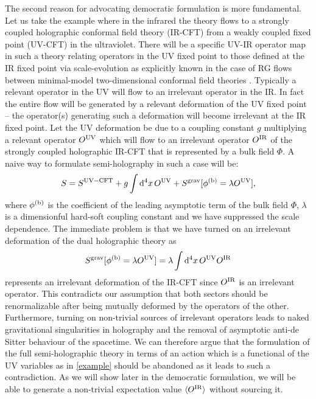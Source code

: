 \documentclass[prd,reprint,a4paper,showpacs,superscriptaddress,11pt,onecolumn,nofootinbib]{revtex4-1}
\renewcommand{\(}{\left(}
\renewcommand{\)}{\right)}
\newcommand{\6}{\partial}
\begin{document}
The second reason for advocating democratic formulation is more fundamental. Let us take the example where in the infrared the theory flows to a strongly coupled holographic conformal field theory (IR-CFT) from a weakly coupled fixed point (UV-CFT) in the ultraviolet. There will be a specific UV-IR operator map in such a theory relating operators in the UV fixed point to those defined at the IR fixed point via scale-evolution as explicitly known in the case of RG flows between minimal-model two-dimensional conformal field theories \cite{Zamolodchikov:1987ti,Zamolodchikov:1987jf,Ludwig:1987gs}. Typically a relevant operator in the UV will flow to an irrelevant operator in the IR. In fact the entire flow will be generated by a relevant deformation of the UV fixed point -- the operator(s) generating such a deformation will become irrelevant at the IR fixed point. Let the UV deformation be due to a coupling constant $g$ multiplying a relevant operator $O^{\rm UV}$ which will flow to an irrelevant operator $O^{\rm IR}$ of the strongly coupled holographic IR-CFT that is represented by a bulk field $\Phi$. A naive way to formulate semi-holography in such a case will be:
\begin{equation}\label{example}
S = S^{\rm UV-CFT} + g \int{\rm d}^4x \, O^{\rm UV} + S^{\rm grav}[\phi^{\rm (b)} = \lambda O^{\rm UV} ],
\end{equation} 
where $\phi^{\rm (b)}$ is the coefficient of the leading asymptotic term of the bulk field $\Phi$, $\lambda$ is a dimensionful hard-soft coupling constant and we have suppressed the scale dependence. The immediate problem is that we have turned on an irrelevant deformation of the dual holographic theory as
\begin{equation}
S^{\rm grav}[\phi^{\rm (b)} = \lambda O^{\rm UV} ] =\lambda \int {\rm d}^4 x\, O^{\rm UV}O^{\rm IR}
\end{equation}
represents an irrelevant deformation of the IR-CFT since $O^{\rm IR}$ is an irrelevant operator. This contradicts our assumption that both sectors should be renormalizable after being mutually deformed by the operators of the other. Furthermore, turning on non-trivial sources of irrelevant operators leads to naked gravitational singularities in holography and the removal of asymptotic anti-de Sitter behaviour of the spacetime. We can therefore argue that the formulation of the full semi-holographic theory in terms of an action which is a functional of the UV variables as in \eqref{example} should be abandoned as it leads to such a contradiction. As we will show later in the democratic formulation, we will be able to generate a non-trivial expectation value $\langle O^{\rm IR}\rangle$ without sourcing it.
\end{document}
